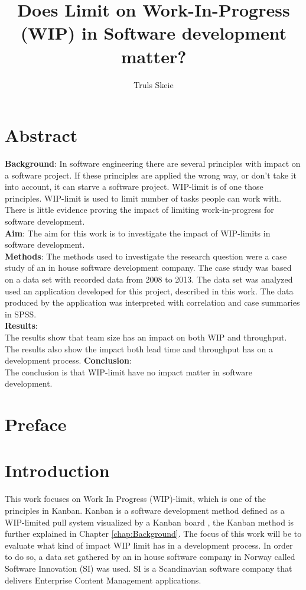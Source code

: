 \documentclass[UKenglish]{ifimaster}  %
\title{Does Limit on Work-In-Progress (WIP) in Software development matter?}        %
\author{Truls Skeie}                      %
\begin{document}
\ififorside{}
\frontmatter{}
\maketitle{}

\chapter*{Abstract}                   %
\textbf{Background}: 
In software engineering there are several principles with impact on a software project. If these principles are applied the wrong way, or don't take it into account, it can starve a software project. WIP-limit is of one those principles.  WIP-limit is used to limit number of tasks people can work with. There is little evidence proving the impact of limiting work-in-progress for software development.\\
\textbf{Aim}: 
The aim for this work is to investigate the impact of WIP-limits in software development. \\
\textbf{Methods}:
The methods used to investigate the research question were a case study of an in house software development company. The case study was based on a data set with recorded data from 2008 to 2013. The data set was analyzed used an application developed for this project, described in this work. The data produced by the application was interpreted with correlation and case summaries in SPSS.\\
\textbf{Results}:\\
The results show that team size has an impact on both WIP and throughput. The results also show the impact both lead time and throughput has on a development process. 
\textbf{Conclusion}:\\
The conclusion is that WIP-limit have no impact matter in software development. 

\tableofcontents{}
\listoffigures{}
\listoftables{}
\lstlistoflistings{}

\chapter*{Preface}                    %

\mainmatter{}
\chapter{Introduction}
\label{chap:intro}
This work focuses on Work In Progress (WIP)-limit, which is one of the principles in Kanban. Kanban is a software development method defined as a WIP-limited pull system visualized by a Kanban board \parencite{DavidAnderson}, the Kanban method is further explained in Chapter \ref{chap:Background}. The focus of this work will be to evaluate what kind of impact WIP limit has in a development process. In order to do so, a data set gathered by an in house software company in Norway called Software Innovation (SI) was used. SI is a Scandinavian software company that delivers Enterprise Content Management applications.
\end{document}
